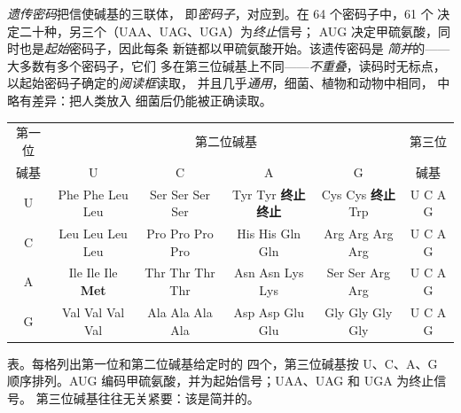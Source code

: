 \begin{definition}[遗传密码]\label{def:b1:gene-expression:code}
\emph{遗传密码}把信使碱基的三联体，
即\emph{密码子}，对应到。在 64 个密码子中，61 个
决定二十种，另三个（UAA、UAG、UGA）为\emph{终止}信号；
AUG 决定甲硫氨酸，同时也是\emph{起始}密码子，因此每条
新链都以甲硫氨酸开始。该遗传密码是
\emph{简并}的——大多数有多个密码子，它们
多在第三位碱基上不同——\emph{不重叠}，读码时无标点，
以起始密码子确定的\emph{阅读框}读取，
并且几乎\emph{通用}，细菌、植物和动物中相同，
中略有差异：把人类放入
细菌后仍能被正确读取。
\end{definition}

\begin{omfigure}
\begin{center}
\footnotesize
\begin{tabular}{c|cccc|c}
\hline
第一位 & \multicolumn{4}{c|}{第二位碱基} & 第三位 \\
碱基 & U & C & A & G & 碱基 \\
\hline
U & Phe Phe Leu Leu & Ser Ser Ser Ser & Tyr Tyr \textbf{终止} \textbf{终止} & Cys Cys \textbf{终止} Trp & U C A G \\
C & Leu Leu Leu Leu & Pro Pro Pro Pro & His His Gln Gln & Arg Arg Arg Arg & U C A G \\
A & Ile Ile Ile \textbf{Met} & Thr Thr Thr Thr & Asn Asn Lys Lys & Ser Ser Arg Arg & U C A G \\
G & Val Val Val Val & Ala Ala Ala Ala & Asp Asp Glu Glu & Gly Gly Gly Gly & U C A G \\
\hline
\end{tabular}
\end{center}

{\small {}表。每格列出第一位和第二位碱基给定时的
四个，第三位碱基按 U、C、A、G 顺序排列。AUG
编码甲硫氨酸，并为起始信号；UAA、UAG 和 UGA 为终止信号。
第三位碱基往往无关紧要：该是简并的。}
\end{omfigure}

